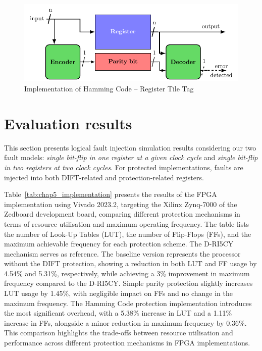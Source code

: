 \begin{figure}[ht]
    \centering
    \includegraphics[page=3, width=\textwidth]{c5_countermeasures_dift/img/archi_contremesures.pdf}
    \caption{Implementation of Hamming Code -- Register Tile Tag}
    \label{fig:implementation_hc_2}
\end{figure}

\section{Evaluation results}

This section presents logical fault injection simulation results considering our two fault models: \textit{single bit-flip in one register at a given clock cycle} and \textit{single bit-flip in two registers at two clock cycles}. For protected implementations, faults are injected into both DIFT-related and protection-related registers.

Table~\ref{tab:chap5_implementation} presents the results of the FPGA implementation using Vivado 2023.2, targeting the Xilinx Zynq-7000 of the Zedboard development board, comparing different protection mechanisms in terms of resource utilisation and maximum operating frequency. The table lists the number of Look-Up Tables (LUT), the number of Flip-Flops (FFs), and the maximum achievable frequency for each protection scheme. The D-RI5CY mechanism serves as reference. The baseline version represents the processor without the DIFT protection, showing a reduction in both LUT and FF usage by 4.54\% and 5.31\%, respectively, while achieving a 3\% improvement in maximum frequency compared to the D-RI5CY.
Simple parity protection slightly increases LUT usage by 1.45\%, with negligible impact on FFs and no change in the maximum frequency. The Hamming Code protection implementation introduces the most significant overhead, with a 5.38\% increase in LUT and a 1.11\% increase in FFs, alongside a minor reduction in maximum frequency by 0.36\%.
This comparison highlights the trade-offs between resource utilisation and performance across different protection mechanisms in FPGA implementations.

